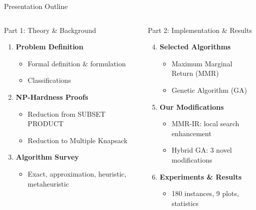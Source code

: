 \documentclass[aspectratio=43,8pt]{beamer}
\begin{document}
\begin{frame}{Presentation Outline}
\begin{columns}[t]
\begin{block}{Part 1: Theory \& Background}
\begin{enumerate}
    \item \textbf{Problem Definition}
    \begin{itemize}
        \item Formal definition \& formulation
        \item Classifications
    \end{itemize}
    \item \textbf{NP-Hardness Proofs}
    \begin{itemize}
        \item Reduction from SUBSET PRODUCT
        \item Reduction to Multiple Knapsack
    \end{itemize}
    \item \textbf{Algorithm Survey}
    \begin{itemize}
        \item Exact, approximation, heuristic, metaheuristic
    \end{itemize}
\end{enumerate}
\end{block}

\begin{block}{Part 2: Implementation \& Results}
\begin{enumerate}
\setcounter{enumi}{3}
    \item \textbf{Selected Algorithms}
    \begin{itemize}
        \item Maximum Marginal Return (MMR)
        \item Genetic Algorithm (GA)
    \end{itemize}
    \item \textbf{Our Modifications}
    \begin{itemize}
        \item MMR-IR: local search enhancement
        \item Hybrid GA: 3 novel modifications
    \end{itemize}
    \item \textbf{Experiments \& Results}
    \begin{itemize}
        \item 180 instances, 9 plots, statistics
    \end{itemize}
\end{enumerate}
\end{block}
\end{columns}
\end{frame}
\end{document}
